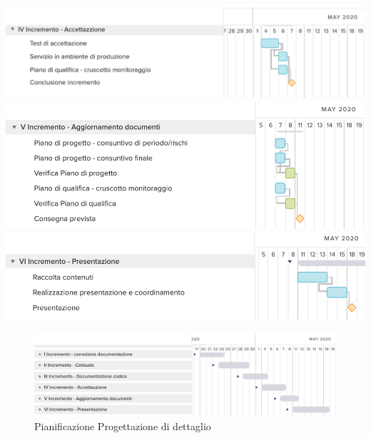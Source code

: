 	\includegraphics[width=\textwidth]{res/img/gantt/RA/4}
	\includegraphics[width=\textwidth]{res/img/gantt/RA/5}
	\includegraphics[width=\textwidth]{res/img/gantt/RA/6}
\begin{figure}[h!]
	\includegraphics[width=\textwidth]{res/img/gantt/RA/f}
	\caption{Pianificazione Progettazione di dettaglio}
\end{figure}
